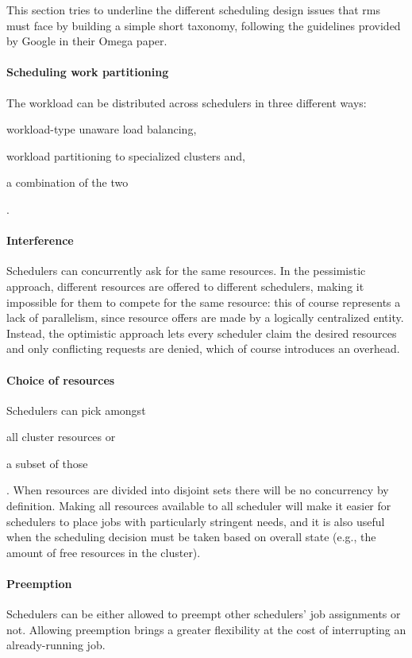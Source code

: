 This section tries to underline the different scheduling design issues that \glspl{rm} must face by building a simple short taxonomy, following the guidelines provided by Google in their Omega \cite{omega} paper.

\paragraph{Scheduling work partitioning}
The workload can be distributed across schedulers in three different ways:
\begin{mylist}
    \item workload-type unaware load balancing,
    \item workload partitioning to specialized clusters and,
    \item a combination of the two
\end{mylist}.

\paragraph{Interference}
Schedulers can concurrently ask for the same resources.
In the pessimistic approach, different resources are offered to different schedulers, making it impossible for them to compete for the same resource: this of course represents a lack of parallelism, since resource offers are made by a logically centralized entity.
Instead, the optimistic approach lets every scheduler claim the desired resources and only conflicting requests are denied, which of course introduces an overhead.

\paragraph{Choice of resources}
Schedulers can pick amongst
\begin{mylist}
    \item all cluster resources or 
    \item a subset of those
\end{mylist}.
When resources are divided into disjoint sets there will be no concurrency by definition.
Making all resources available to all scheduler will make it easier for schedulers to place jobs with particularly stringent needs, and it is also useful when the scheduling decision must be taken based on overall state (e.g., the amount of free resources in the cluster).

\paragraph{Preemption}
Schedulers can be either allowed to preempt other schedulers' job assignments or not.
Allowing preemption brings a greater flexibility at the cost of interrupting an already-running job.

